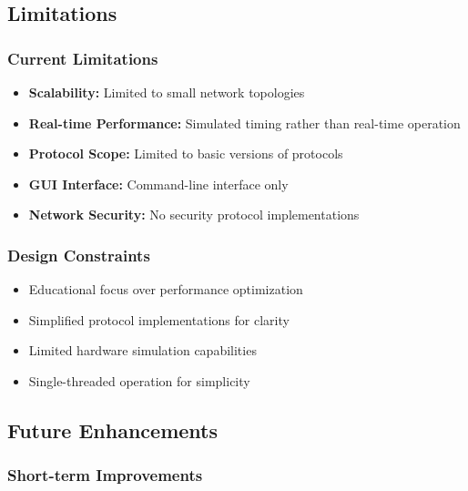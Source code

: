 \documentclass[12pt,a4paper]{article}
\begin{document}
\subsection{Limitations}

\subsubsection{Current Limitations}

\begin{itemize}
\item \textbf{Scalability:} Limited to small network topologies
\item \textbf{Real-time Performance:} Simulated timing rather than real-time operation
\item \textbf{Protocol Scope:} Limited to basic versions of protocols
\item \textbf{GUI Interface:} Command-line interface only
\item \textbf{Network Security:} No security protocol implementations
\end{itemize}

\subsubsection{Design Constraints}

\begin{itemize}
\item Educational focus over performance optimization
\item Simplified protocol implementations for clarity
\item Limited hardware simulation capabilities
\item Single-threaded operation for simplicity
\end{itemize}

\subsection{Future Enhancements}

\subsubsection{Short-term Improvements}
\end{document}
